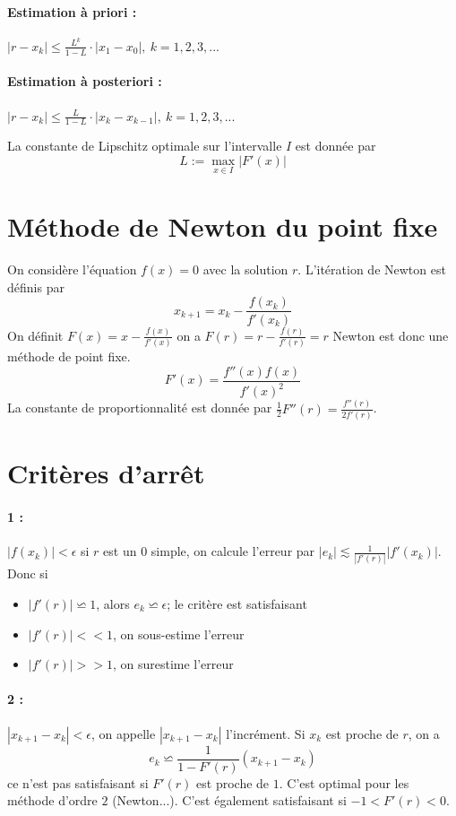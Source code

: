 \documentclass[a4paper,9pt]{extarticle}
\begin{document}
\begin{multicols*}{2}
\paragraph*{Estimation à priori :} $|r-x_k|\leq \frac{L^k}{1-L}\cdot |x_1-x_0|, \ k=1,2,3,...$
\paragraph*{Estimation à posteriori :} $|r-x_k| \leq \frac{L}{1-L}\cdot |x_k-x_{k-1}|, \ k=1,2,3,...$

La constante de Lipschitz optimale sur l'intervalle $I$ est donnée par
$$
L:=\max_{x\in I}|F'(x)|
$$

\section{Méthode de Newton du point fixe}

On considère l'équation $f(x)=0$ avec la solution $r$. L'itération de Newton est définis par
$$
x_{k+1}=x_k-\frac{f(x_k)}{f'(x_k)}
$$
On définit $F(x)=x-\frac{f(x)}{f'(x)}$ on a $F(r)=r-\frac{f(r)}{f'(r)}=r$ Newton est donc une méthode de point fixe.
$$
F'(x)=\frac{f''(x)f(x)}{f'(x)^2}
$$
La constante de proportionnalité est donnée par $\frac{1}{2}F''(r)=\frac{f''(r)}{2f'(r)}$.

\section{Critères d'arrêt}
\paragraph*{1 :} $|f(x_k)|<\epsilon$ si $r$ est un $0$ simple, on calcule l'erreur par $|e_k|\lesssim\frac{1}{|f'(r)|}|f'(x_k)|$. Donc si 
\begin{itemize}
    \item $|f'(r)| \backsimeq 1$, alors $e_k \backsimeq\epsilon$; le critère est satisfaisant
    \item $|f'(r)| << 1$, on sous-estime l'erreur
    \item $|f'(r)| >> 1$, on surestime l'erreur
\end{itemize}

\paragraph*{2 :} $|x_{k+1}-x_k| < \epsilon$, on appelle $|x_{k+1}-x_k|$ l'incrément. Si $x_k$ est proche de $r$, on a
$$
e_k \backsimeq \frac{1}{1-F'(r)}(x_{k+1}-x_k)
$$
ce n'est pas satisfaisant si $F'(r)$ est proche de $1$. C'est optimal pour les méthode d'ordre $2$ (Newton...). C'est également satisfaisant si $-1<F'(r) < 0$.


\end{multicols*}
\end{document}
